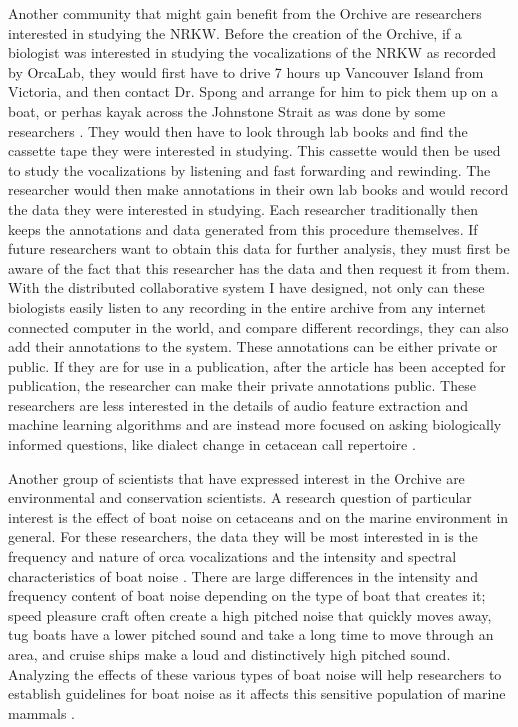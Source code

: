 Another community that might gain benefit from the Orchive are
researchers interested in studying the NRKW.  Before the creation of the Orchive, if a biologist was
interested in studying the vocalizations of the NRKW as recorded by
OrcaLab, they would first have to drive 7 hours up Vancouver Island
from Victoria, and then contact Dr. Spong and arrange for him to pick
them up on a boat, or perhas kayak across the Johnstone Strait as was
done by some researchers \cite{deecke1999quantifying}. They would then
have to look through lab books and find the cassette tape they were
interested in studying.  This cassette would then be used to study the
vocalizations by listening and fast forwarding and rewinding.  The
researcher would then make annotations in their own lab books and
would record the data they were interested in studying.  Each
researcher traditionally then keeps the annotations and data generated
from this procedure themselves.  If future researchers want to obtain
this data for further analysis, they must first be aware of the fact
that this researcher has the data and then request it from them.  With
the distributed collaborative system I have designed, not only can
these biologists easily listen to any recording in the entire archive
from any internet connected computer in the world, and compare
different recordings, they can also add their annotations to the
system.  These annotations can be either private or public.  If they
are for use in a publication, after the article has been accepted for
publication, the researcher can make their private annotations public.
These researchers are less interested in the details of audio feature
extraction and machine learning algorithms and are instead more
focused on asking biologically informed questions, like dialect change
in cetacean call repertoire \cite{deecke2000dialect}.

Another group of scientists that have expressed interest in the
Orchive are environmental and conservation scientists. A research
question of particular interest is the effect of boat noise
\cite{foote2004noise} on cetaceans and on the marine environment in
general.  For these researchers, the data they will be most interested
in is the frequency and nature of orca vocalizations and the intensity
and spectral characteristics of boat noise \cite{holt2009speakingup}.
There are large differences in the intensity and frequency content of
boat noise depending on the type of boat that creates it; speed
pleasure craft often create a high pitched noise that quickly moves
away, tug boats have a lower pitched sound and take a long time to
move through an area, and cruise ships make a loud and distinctively
high pitched sound.  Analyzing the effects of these various types of
boat noise will help researchers to establish guidelines for boat
noise as it affects this sensitive population of marine mammals
\cite{doksaeter2009orca}.

